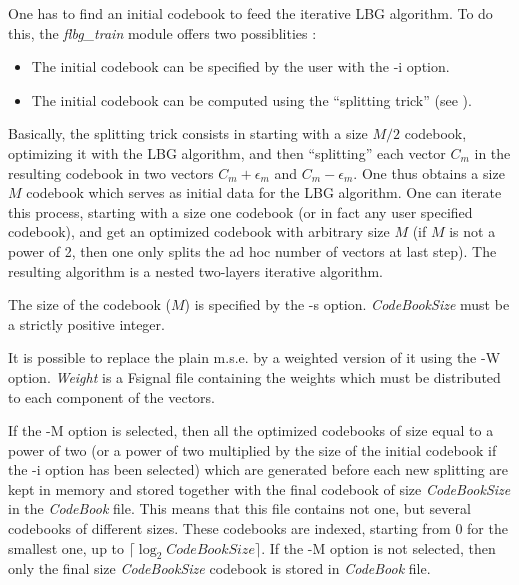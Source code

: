 One has to find an initial codebook to feed the iterative LBG algorithm. 
To do this, the {\em flbg\_train} module offers two possiblities : 
\begin{itemize} 
\item
The initial codebook can be specified by the user with the -i option. 
\item
The initial codebook can be computed using the ``splitting trick'' 
(see \cite{kn:lbg}).
\end{itemize}
Basically, the splitting trick consists in starting with a size $M/2$ 
codebook, optimizing it with the LBG algorithm, and then ``splitting'' 
each vector $C_m$ in the resulting codebook in two vectors 
$C_m+\epsilon_m$ and $C_m-\epsilon_m$. One thus obtains a size $M$ 
codebook which serves as initial data for the LBG algorithm. 
One can iterate this process, starting with a size one codebook 
(or in fact any user specified codebook), and get an optimized codebook 
with arbitrary size $M$ (if $M$ is not a power of 2, then one only splits 
the ad hoc number of vectors at last step). The resulting algorithm 
is a nested two-layers iterative algorithm. 

The size of the codebook ($M$) is specified by the -s option. 
{\em CodeBookSize} must be a strictly positive integer. 

It is possible to replace the plain m.s.e. by a weighted version of it 
using the -W option. {\em Weight} is a Fsignal file containing the weights 
which must be distributed to each component of the vectors. 

If the -M option is selected, then all the optimized codebooks of size 
equal to a power of two (or a power of two multiplied by the size of 
the initial codebook if the -i option has been selected) which are generated 
before each new splitting are kept in memory and stored together 
with the final codebook of size {\em CodeBookSize} in the {\em CodeBook} file. 
This means that this file contains not one, but several codebooks 
of different sizes. These codebooks are indexed, starting from 0 
for the smallest one, up to $\lceil \log_2 CodeBookSize \rceil$. 
If the -M option is not selected, then only the final size {\em CodeBookSize} 
codebook is stored in {\em CodeBook} file. 

